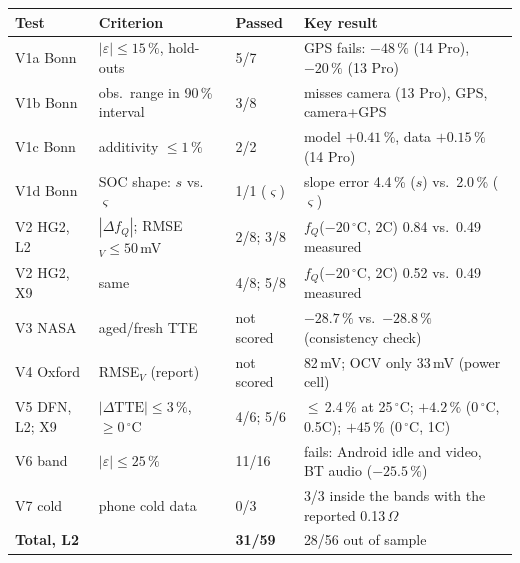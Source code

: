 \setlength{\tabcolsep}{4pt}
\begin{tabular}{@{}lllp{}@{}}
\toprule
Test & Criterion & Passed & Key result \\
\midrule
V1a Bonn & $|\varepsilon|\le 15\,\%$, hold-outs & 5/7 & GPS fails: $-48\,\%$ (14 Pro), $-20\,\%$ (13 Pro) \\
V1b Bonn & obs.\ range in 90\,\% interval & 3/8 & misses camera (13 Pro), GPS, camera+GPS \\
V1c Bonn & additivity $\le 1\,\%$ & 2/2 & model $+0.41\,\%$, data $+0.15\,\%$ (14 Pro) \\
V1d Bonn & SOC shape: $s$ vs.\ $\varsigma$ & 1/1 ($\varsigma$) & slope error 4.4\,\% ($s$) vs.\ 2.0\,\% ($\varsigma$) \\
V2 HG2, L2 & $|\Delta f_Q|$; RMSE$_V\le 50$\,mV & 2/8; 3/8 & $f_Q$($-20\,^\circ$C, 2C) 0.84 vs.\ 0.49 measured \\
V2 HG2, X9 & same & 4/8; 5/8 & $f_Q$($-20\,^\circ$C, 2C) 0.52 vs.\ 0.49 measured \\
V3 NASA & aged/fresh TTE & not scored & $-28.7\,\%$ vs.\ $-28.8\,\%$ (consistency check) \\
V4 Oxford & RMSE$_V$ (report) & not scored & 82\,mV; OCV only 33\,mV (power cell) \\
V5 DFN, L2; X9 & $|\Delta\mathrm{TTE}|\le 3\,\%$, $\ge 0\,^\circ$C & 4/6; 5/6 & $\le$\,2.4\,\% at 25\,$^\circ$C; $+4.2\,\%$ (0\,$^\circ$C, 0.5C); $+45\,\%$ (0\,$^\circ$C, 1C) \\
V6 band & $|\varepsilon|\le 25\,\%$ & 11/16 & fails: Android idle and video, BT audio ($-25.5\,\%$) \\
V7 cold & phone cold data \cite{LEE20} & 0/3 & 3/3 inside the bands with the reported 0.13\,$\Omega$ \\
\midrule
\textbf{Total, L2} & & \textbf{31/59} & 28/56 out of sample \\
\bottomrule
\end{tabular}
